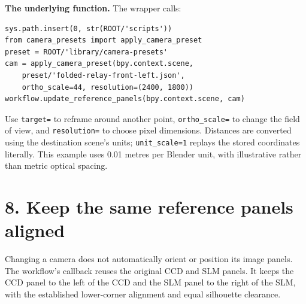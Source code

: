 \documentclass[11pt,a4paper]{article}
\begin{document}
\textbf{The underlying function.} The wrapper calls:
\begin{Verbatim}[fontsize=\small]
sys.path.insert(0, str(ROOT/'scripts'))
from camera_presets import apply_camera_preset
preset = ROOT/'library/camera-presets'
cam = apply_camera_preset(bpy.context.scene,
    preset/'folded-relay-front-left.json',
    ortho_scale=44, resolution=(2400, 1800))
workflow.update_reference_panels(bpy.context.scene, cam)
\end{Verbatim}
Use \texttt{target=} to reframe around another point, \texttt{ortho\_scale=} to change the field of view, and \texttt{resolution=} to choose pixel dimensions. Distances are converted using the destination scene's units; \texttt{unit\_scale=1} replays the stored coordinates literally. This example uses 0.01 metres per Blender unit, with illustrative rather than metric optical spacing.

\clearpage
\section*{8. Keep the same reference panels aligned}
Changing a camera does not automatically orient or position its image panels. The workflow's callback reuses the original CCD and SLM panels. It keeps the CCD panel to the left of the CCD and the SLM panel to the right of the SLM, with the established lower-corner alignment and equal silhouette clearance.
\end{document}
